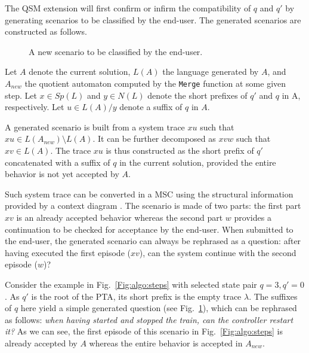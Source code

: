 \begin{description}
The QSM extension will first confirm or infirm the compatibility of $q$ and $q'$ by generating scenarios to be classified by the end-user. The generated scenarios are constructed as follows.

\begin{figure}
\centering
{}
\caption{A new scenario to be classified by the end-user\label{Fig:generated:question}.}
\end{figure}

Let $A$ denote the current solution, $L(A)$ the language generated by $A$, and $A_{new}$ the quotient automaton computed by the \texttt{Merge} function at some given step. Let $x \in Sp(L)$ and $y \in N(L)$ denote the short prefixes of $q'$ and $q$ in A, respectively. Let $u \in L(A)/y$ denote a suffix of $q$ in $A$. 

A generated scenario is built from a system trace $xu$ such that $xu \in L(A_{new})\setminus L(A)$. It can be further decomposed as $xvw$ such that $xv \in L(A)$. The trace $xu$ is thus constructed as the short prefix of $q'$ concatenated with a suffix of $q$ in the current solution, provided the entire behavior is not yet accepted by $A$. 

Such system trace can be converted in a MSC using the structural information provided by a context diagram \cite{Jackson:1995}. The scenario is made of two parts: the first part $xv$ is an already accepted behavior whereas the second part $w$ provides a continuation to be checked for acceptance by the end-user. When submitted to the end-user, the generated scenario can always be rephrased as a question: after having executed the first episode ($xv$), can the system continue with the second episode ($w$)? 

Consider the example in Fig.~\ref{Fig:algo:steps} with selected state pair $q=3, q'=0$. As $q'$ is the root of the PTA, its short prefix is the empty trace $\lambda$. The suffixes of $q$ here yield a simple generated question (see Fig.~\ref{Fig:generated:question}), which can be rephrased as follows: \emph{when having started and stopped the train, can the controller restart it?} As we can see, the first episode of this scenario in Fig.~\ref{Fig:algo:steps} is already accepted by $A$ whereas the entire behavior is accepted in $A_{new}$.


\end{description}
